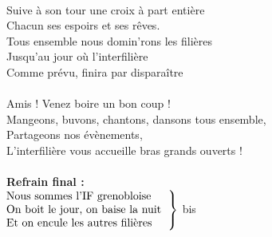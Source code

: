\\Suive à son tour une croix à part entière
\\Chacun ses espoirs et ses rêves.
\\Tous ensemble nous domin'rons les filières
\\Jusqu'au jour où l'interfilière
\\Comme prévu, finira par disparaître
\\\\Amis ! Venez boire un bon coup !
\\Mangeons, buvons, chantons, dansons tous ensemble,
\\Partageons nos évènements,
\\L'interfilière vous accueille bras grands ouverts !
\\\\\textbf{Refrain final :}
\\
$\left . \begin{tabular}{l}
\hspace{-0.4cm}
Nous sommes l'IF grenobloise
\\\hspace{-0.4cm}
On boit le jour, on baise la nuit  
\\\hspace{-0.4cm}
Et on encule les autres filières  
\end{tabular}\right\rbrace$ bis

\breakpage